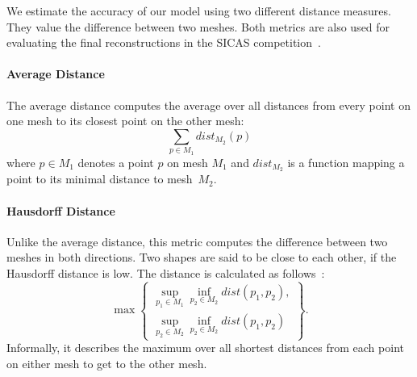 We estimate the accuracy of our model using two different distance measures.
They value the difference between two meshes.
Both metrics are also used for evaluating the final reconstructions in the SICAS competition~\cite{smir}.

\paragraph{Average Distance}
The average distance computes the average over all distances from every point on one mesh to its closest point on the other mesh:
$$ \sum_{p \in M_1} \mathit{dist}_{M_2}(p) $$
where $p \in M_1$ denotes a point $p$ on mesh $M_1$ and $\mathit{dist}_{M_2}$ is a function mapping a point to its minimal distance to mesh~$M_2$.

\paragraph{Hausdorff Distance}
Unlike the average distance, this metric computes the difference between two meshes in both directions.
Two shapes are said to be close to each other, if the Hausdorff distance is low.
The distance is calculated as follows~\cite{hausdorff}:
$$ \max \left\{ \begin{array}{ll}
  \sup_{p_1 \in M_1} \inf_{p_2 \in M_2} \mathit{dist}(p_1, p_2), \\
  \sup_{p_2 \in M_2} \inf_{p_2 \in M_2} \mathit{dist}(p_1, p_2) 
\end{array}\right\}. $$
Informally, it describes the maximum over all shortest distances from each point on either mesh to get to the other mesh.
